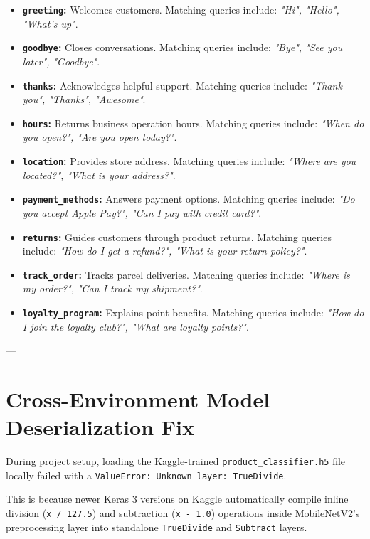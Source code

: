 \documentclass[12pt,a4paper]{article}
\begin{document}
\begin{itemize}
    \item \textbf{\texttt{greeting}:} Welcomes customers. Matching queries include: \textit{"Hi", "Hello", "What's up"}.
    \item \textbf{\texttt{goodbye}:} Closes conversations. Matching queries include: \textit{"Bye", "See you later", "Goodbye"}.
    \item \textbf{\texttt{thanks}:} Acknowledges helpful support. Matching queries include: \textit{"Thank you", "Thanks", "Awesome"}.
    \item \textbf{\texttt{hours}:} Returns business operation hours. Matching queries include: \textit{"When do you open?", "Are you open today?"}.
    \item \textbf{\texttt{location}:} Provides store address. Matching queries include: \textit{"Where are you located?", "What is your address?"}.
    \item \textbf{\texttt{payment\_methods}:} Answers payment options. Matching queries include: \textit{"Do you accept Apple Pay?", "Can I pay with credit card?"}.
    \item \textbf{\texttt{returns}:} Guides customers through product returns. Matching queries include: \textit{"How do I get a refund?", "What is your return policy?"}.
    \item \textbf{\texttt{track\_order}:} Tracks parcel deliveries. Matching queries include: \textit{"Where is my order?", "Can I track my shipment?"}.
    \item \textbf{\texttt{loyalty\_program}:} Explains point benefits. Matching queries include: \textit{"How do I join the loyalty club?", "What are loyalty points?"}.
\end{itemize}

---

\section{Cross-Environment Model Deserialization Fix}
During project setup, loading the Kaggle-trained \texttt{product\_classifier.h5} file locally failed with a \texttt{ValueError: Unknown layer: TrueDivide}. 

This is because newer Keras 3 versions on Kaggle automatically compile inline division (\texttt{x / 127.5}) and subtraction (\texttt{x - 1.0}) operations inside MobileNetV2's preprocessing layer into standalone \texttt{TrueDivide} and \texttt{Subtract} layers. 
\end{document}
